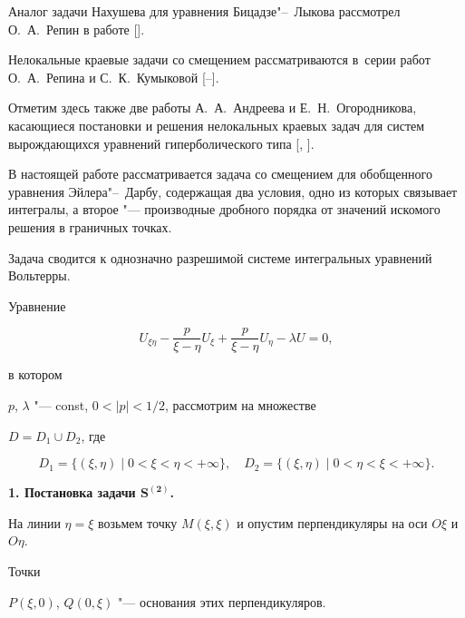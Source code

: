 Аналог задачи Нахушева для уравнения Бицадзе"--~Лыкова рассмотрел О.~А.~Репин в работе []. 

Нелокальные краевые задачи со смещением рассматриваются в~серии работ О.~А.~Репина и С.~К.~Кумыковой [--]. 

Отметим здесь также две работы А.~А.~Андреева и Е.~Н.~Огородникова, касающиеся постановки и решения нелокальных краевых задач для систем вырождающихся уравнений гиперболического типа [, ].



В настоящей работе рассматривается задача со смещением для обобщенного уравнения Эйлера"--~Дарбу, содержащая два условия, одно из которых связывает интегралы, а второе "--- производные дробного порядка от значений искомого решения в граничных точках. 

Задача сводится к однозначно разрешимой системе интегральных уравнений Вольтерры. 




Уравнение

\begin{equation}\label{dolg:eq1}

U_{\xi\eta} - \frac{p}{\xi-\eta} U_\xi +  \frac{p}{\xi-\eta} U_\eta - \lambda U = 0,

\end{equation}

в котором

$p$, $\lambda$ "--- const, $0<|p|<{1}/{2}$, рассмотрим на множестве

$D=D_1\cup D_2$, где 

$$D_1=\{(\xi,\eta)\mid 0<\xi<\eta<+\infty\},\quad 

D_2=\{(\xi,\eta)\mid 0<\eta<\xi<+\infty\}.$$



\smallskip





\textbf{1. Постановка задачи $\boldsymbol{S^{(2)}}$.}

На линии $\eta=\xi$ возьмем точку $M(\xi,\xi)$ и опустим перпендикуляры на оси $O\xi$ и $O\eta$.

Точки 

 $P(\xi, 0)$, $Q(0, \xi)$ "--- основания этих перпендикуляров. 

